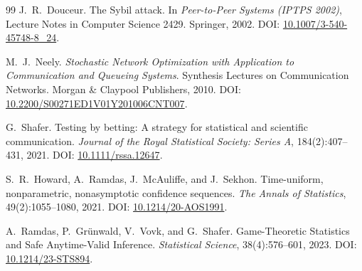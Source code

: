 \documentclass[11pt,a4paper]{article}
\theoremstyle{definition}
\theoremstyle{remark}
\begin{document}
\begin{thebibliography}{99}
J.~R.~Douceur.
\newblock The Sybil attack.
\newblock In \emph{Peer-to-Peer Systems (IPTPS 2002)}, Lecture Notes in Computer Science 2429.
\newblock Springer, 2002.
\newblock DOI: \href{https://doi.org/10.1007/3-540-45748-8_24}{10.1007/3-540-45748-8\_24}.

M.~J.~Neely.
\newblock \emph{Stochastic Network Optimization with Application to Communication and Queueing Systems}.
\newblock Synthesis Lectures on Communication Networks.
\newblock Morgan \& Claypool Publishers, 2010.
\newblock DOI: \href{https://doi.org/10.2200/S00271ED1V01Y201006CNT007}{10.2200/S00271ED1V01Y201006CNT007}.

G.~Shafer.
\newblock Testing by betting: A strategy for statistical and scientific communication.
\newblock \emph{Journal of the Royal Statistical Society: Series A}, 184(2):407--431, 2021.
\newblock DOI: \href{https://doi.org/10.1111/rssa.12647}{10.1111/rssa.12647}.

S.~R.~Howard, A.~Ramdas, J.~McAuliffe, and J.~Sekhon.
\newblock Time-uniform, nonparametric, nonasymptotic confidence sequences.
\newblock \emph{The Annals of Statistics}, 49(2):1055--1080, 2021.
\newblock DOI: \href{https://doi.org/10.1214/20-AOS1991}{10.1214/20-AOS1991}.

A.~Ramdas, P.~Gr{\"u}nwald, V.~Vovk, and G.~Shafer.
\newblock Game-Theoretic Statistics and Safe Anytime-Valid Inference.
\newblock \emph{Statistical Science}, 38(4):576--601, 2023.
\newblock DOI: \href{https://doi.org/10.1214/23-STS894}{10.1214/23-STS894}.

\end{thebibliography}
\end{document}
